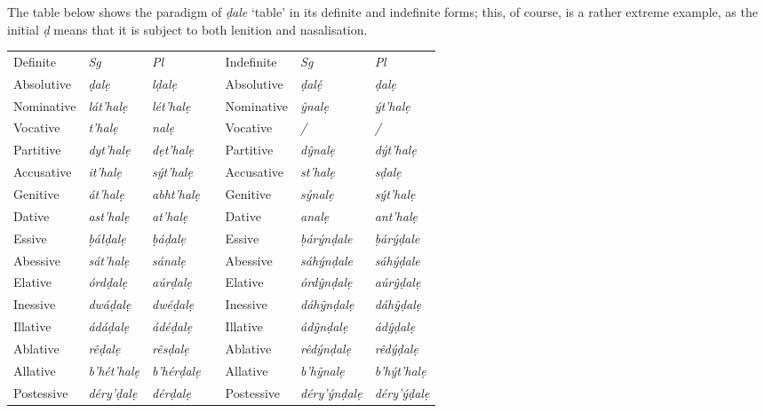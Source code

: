\documentclass[a4paper, 12pt, twoside, final]{article}
\let \nf \normalfont
\let \w \textit
\begin{document}
\noindent The table below shows the paradigm of \w{ḍale} ‘table’ in its definite and indefinite forms; this, of course,
is a rather extreme example, as the initial \w{ḍ} means that it is subject to both lenition and nasalisation.

\begin{table}[H]
\centering
\noindent\begin{tabular}{l|>{\it}l|>{\it}lll|>{\it}l|>{\it}l}
Definite    &\nf Sg&\nf Pl && Indefinite&\nf Sg&\nf Pl\\\cline{1-3}\cline{5-7}

Absolutive    & ḍalẹ        & lḍalẹ      && Absolutive    & ḍalẹ́            & ḍalẹ        \\
Nominative    & lát’halẹ    & lét’halẹ   && Nominative    & ŷnalẹ           & ýt’halẹ     \\
Vocative      & t’halẹ      & nalẹ       && Vocative      & /               & /           \\
Partitive     & dyt’halẹ    & dẹt’halẹ   && Partitive     & dŷnalẹ          & dýt’halẹ    \\
Accusative    & it’halẹ     & sýt’halẹ   && Accusative    & st’halẹ         & sḍalẹ       \\
Genitive      & át’halẹ     & abht’halẹ  && Genitive      & sýnalẹ          & sýt’halẹ    \\
Dative        & ast’halẹ    & at’halẹ    && Dative        & analẹ           & ant’halẹ    \\
Essive        & ḅáłḍalẹ     & ḅáḍalẹ     && Essive        & ḅárýnḍale       & ḅárýḍale    \\
Abessive      & sát’halẹ    & sánalẹ     && Abessive      & sáhýnḍale       & sáhýḍale    \\
Elative       & órdḍalẹ     & aúrḍalẹ    && Elative       & órdŷnḍalẹ       & aúrŷḍalẹ    \\
Inessive      & dwáḍalẹ     & dwéḍalẹ    && Inessive      & dáhŷnḍalẹ       & dáhŷḍalẹ    \\
Illative      & ádáḍalẹ     & ádéḍalẹ    && Illative      & ádŷnḍalẹ        & ádŷḍalẹ     \\
Ablative      & rêḍalẹ      & rêsḍalẹ    && Ablative      & rêdýnḍalẹ       & rêdýḍalẹ    \\
Allative      & b’hét’halẹ  & b’hérḍalẹ  && Allative      & b’hŷnalẹ        & b’hýt’halẹ  \\
Postessive    & déry’ḍalẹ   & dérḍalẹ    && Postessive    & déry’ýnḍalẹ     & déry’ýḍalẹ  \\

\end{tabular}
\end{table}
\end{document}
